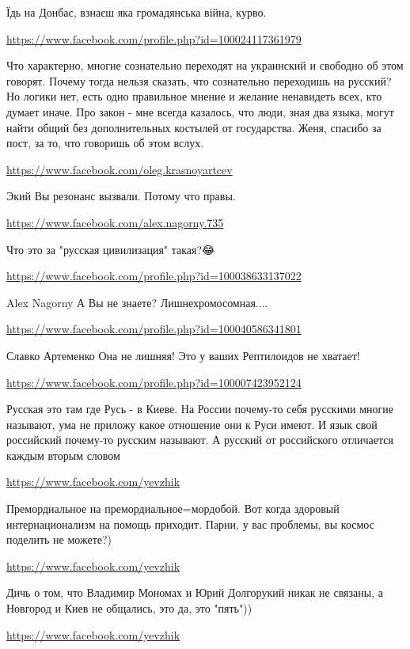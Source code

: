\documentclass[a4paper,11pt]{extreport}
\begin{document}
\begin{itemize}
Їдь на Донбас, взнаєш яка громадянська війна, курво.

\url{https://www.facebook.com/profile.php?id=100024117361979}

Что характерно, многие сознательно переходят на украинский и свободно об этом говорят. Почему тогда нельзя сказать, что сознательно переходишь на русский? Но логики нет, есть одно правильное мнение и желание ненавидеть всех, кто думает иначе.
Про закон - мне всегда казалось, что люди, зная два языка, могут найти общий без дополнительных костылей от государства.
Женя, спасибо за пост, за то, что говоришь об этом вслух.

\url{https://www.facebook.com/oleg.krasnoyartcev}

Экий Вы резонанс вызвали. Потому что правы.

\url{https://www.facebook.com/alex.nagorny.735}

Что это за "русская цивилизация" такая?😂

\begin{itemize}
\url{https://www.facebook.com/profile.php?id=100038633137022}

Alex Nagorny А Вы не знаете? Лишнехромосомная....

\url{https://www.facebook.com/profile.php?id=100040586341801}

Славко Артеменко Она не лишняя! Это у ваших Рептилоидов не хватает!

\url{https://www.facebook.com/profile.php?id=100007423952124}

Русская это там где Русь - в Киеве. На России почему-то себя русскими многие называют, ума не приложу какое отношение они к Руси имеют. И язык свой российский почему-то русским называют. А русский от российского отличается каждым вторым словом

\url{https://www.facebook.com/yevzhik}

Премордиальное на премордиальное=мордобой. Вот когда здоровый интернационализм на помощь приходит. Парни, у вас проблемы, вы космос поделить не можете?)

\url{https://www.facebook.com/yevzhik}

Дичь о том, что Владимир Мономах и Юрий Долгорукий никак не связаны, а Новгород и Киев не общались, это да, это "пять"))

\url{https://www.facebook.com/yevzhik}


\end{itemize}
\end{itemize}
\end{document}
